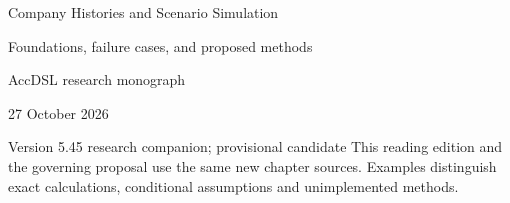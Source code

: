 \documentclass[11pt,a4paper]{report}
\begin{document}
\hypersetup{pageanchor=false}
\begin{titlepage}
{\Huge Company Histories and Scenario Simulation\par}
\vspace{12mm}
{\Large Foundations, failure cases, and proposed methods\par}
\vspace{8mm}
AccDSL research monograph\par 27 October 2026\par Version 5.45 research companion; provisional candidate
\vfill
This reading edition and the governing proposal use the same new chapter sources. Examples distinguish exact calculations, conditional assumptions and unimplemented methods.
\end{titlepage}
\hypersetup{pageanchor=true}
\tableofcontents
\clearpage{}


























\clearpage\label{sim:body-end}

\begingroup\raggedright
\endgroup
\end{document}
